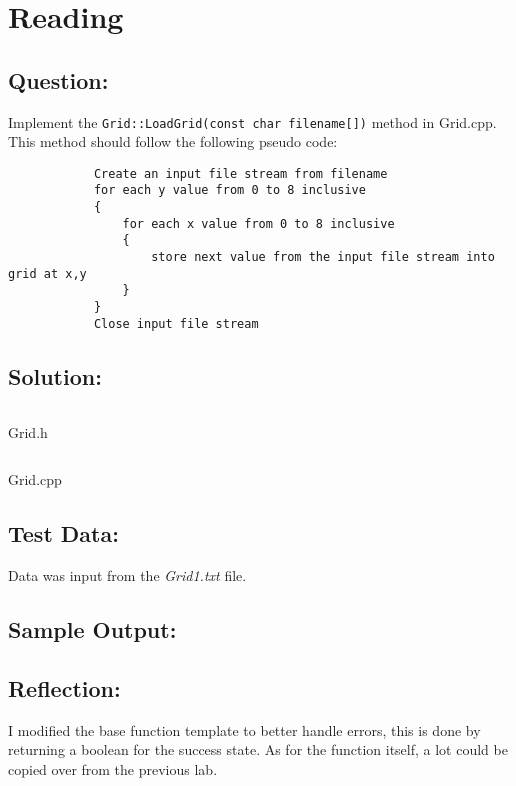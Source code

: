 \section{Reading}
    \subsection*{Question:}
        Implement the \texttt{Grid::LoadGrid(const char filename[])} method in Grid.cpp.
        This method should follow the following pseudo code:
        \begin{verbatim}
            Create an input file stream from filename
            for each y value from 0 to 8 inclusive
            {
                for each x value from 0 to 8 inclusive
                {
                    store next value from the input file stream into grid at x,y
                }
            }
            Close input file stream
        \end{verbatim}
            
    \subsection*{Solution:}
        \begin{listing}[!ht]
            \inputminted[firstline=6, lastline=19]{cpp}{../Tasks/02-Reading/Grid.h}
            \caption{Grid.h}
        \end{listing}

        \newpage

        \begin{listing}[!ht]
            \inputminted[firstline=14]{cpp}{../Tasks/02-Reading/Grid.cpp}
            \caption{Grid.cpp}
        \end{listing}

    \subsection*{Test Data:}
        Data was input from the \textit{Grid1.txt} file.
        
    \subsection*{Sample Output:}

    \subsection*{Reflection:}
        I modified the base function template to better handle errors,
        this is done by returning a boolean for the success state.
        As for the function itself, a lot could be copied over from the previous
        lab.
            
